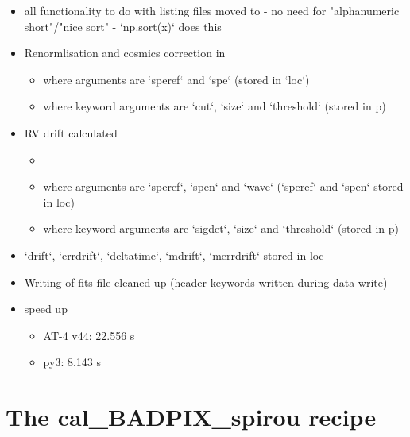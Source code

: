 \begin{itemize}
\item all functionality to do with listing files moved to  - no need for "alphanumeric short"/"nice sort" - `np.sort(x)` does this
    
\item Renormlisation and cosmics correction in 
	\begin{itemize}
	\item where arguments are `speref` and `spe` (stored in `loc`)
	\item where keyword arguments are `cut`, `size` and `threshold` (stored in p)
	\end{itemize}

\item RV drift calculated
	\begin{itemize}
	\item {}
	\item where arguments are `speref`, `spen` and `wave` (`speref` and `spen` stored in loc)
	\item where keyword arguments are `sigdet`, `size` and `threshold` (stored in p)
	\end{itemize}

\item `drift`, `errdrift`, `deltatime`, `mdrift`, `merrdrift` stored in loc

\item Writing of fits file cleaned up (header keywords written during data write)

\item speed up
	\begin{itemize}
	\item AT-4 v44: 22.556 s
	\item py3:  8.143 s
	\end{itemize}

\end{itemize}



\section{The cal\_BADPIX\_spirou recipe}
\label{ch:changelog:At4:cal_BADPIX_spirou}

